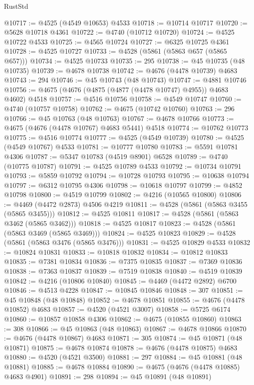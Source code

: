 \begin{lexlean}{RustStd}
\begin{coremodule}
{\begin{coremodule}
{{{{{{{{{{{{{{{{{{{{{{{{{{{{{{{{{{{{{{{{{{{{{{{{{{{{{{{{{{{{@10717 := @4525 (@4549 @10653) @4533
@10718 := @10714 @10717
@10720 := @5628 @10718 @4361
@10722 := @4740 (@10712 @10720)
@10724 := @4525 @10722 @4533
@10725 := @4565 @10724
@10727 := @6325 @10725 @4361
@10728 := @4525 @10727
@10733 := @4528 (@5861 (@5863 @657 (@5865 @657)))
@10734 := @4525 @10733
@10735 := 295
@10738 := @45 @10735 (@48 @10735)
@10739 := @4678 @10738
@10742 := @4676 (@4478 @10739) @4683
@10743 := 294
@10746 := @45 @10743 (@48 @10743)
@10747 := @4881 @10746
@10756 := @4675 (@4676 (@4875 (@4877 (@4478 @10747) @4955)) @4683 @4602) @4518
@10757 := @4516 @10756
@10758 := @4549 @10747
@10760 := @4740 (@10757 @10758)
@10762 := @4675 (@10742 @10760)
@10763 := 296
@10766 := @45 @10763 (@48 @10763)
@10767 := @4678 @10766
@10773 := @4675 (@4676 (@4478 @10767) @4683 @5441) @4518
@10774 := @10762 @10773
@10775 := @4516 @10774
@10777 := @4525 (@4549 @10739)
@10780 := @4525 (@4549 @10767) @4533
@10781 := @10777 @10780
@10783 := @5591 @10781 @4306
@10787 := @5347 @10783 (@4519 @8901) @6528
@10789 := @4740 (@10775 @10787)
@10791 := @4525 @10789 @4533
@10792 := @10734 @10791
@10793 := @5859 @10792
@10794 := @10728 @10793
@10795 := @10638 @10794
@10797 := @6312 @10795 @4306
@10798 := @10618 @10797
@10799 := @4852 @10798
@10800 := @4519 @10799
@10802 := @4216 (@10565 @10800)
@10806 := @4469 (@4472 @2873) @4506 @4219
@10811 := @4528 (@5861 (@5863 @3455 (@5865 @3455)))
@10812 := @4525 @10811
@10817 := @4528 (@5861 (@5863 @3462 (@5865 @3462)))
@10818 := @4525 @10817
@10823 := @4528 (@5861 (@5863 @3469 (@5865 @3469)))
@10824 := @4525 @10823
@10829 := @4528 (@5861 (@5863 @3476 (@5865 @3476)))
@10831 := @4525 @10829 @4533
@10832 := @10824 @10831
@10833 := @10818 @10832
@10834 := @10812 @10833
@10835 := @7381 @10834
@10836 := @7375 @10835
@10837 := @7369 @10836
@10838 := @7363 @10837
@10839 := @7519 @10838
@10840 := @4519 @10839
@10842 := @4216 (@10806 @10840)
@10845 := @4469 (@4472 @2892) @6700
@10846 := @4513 @4228
@10847 := @10845 @10846
@10848 := 307
@10851 := @45 @10848 (@48 @10848)
@10852 := @4678 @10851
@10855 := @4676 (@4478 @10852) @4683
@10857 := @4520 (@4521 @3007)
@10858 := @5725 @6174
@10860 := @10857 @10858 @4306
@10862 := @4675 (@10855 @10860)
@10863 := 308
@10866 := @45 @10863 (@48 @10863)
@10867 := @4678 @10866
@10870 := @4676 (@4478 @10867) @4683
@10871 := 305
@10874 := @45 @10871 (@48 @10871)
@10875 := @4678 @10874
@10878 := @4676 (@4478 @10875) @4683
@10880 := @4520 (@4521 @3500)
@10881 := 297
@10884 := @45 @10881 (@48 @10881)
@10885 := @4678 @10884
@10890 := @4675 (@4676 (@4478 @10885) @4683 @4901)
@10891 := 298
@10894 := @45 @10891 (@48 @10891)
}}}}}}}}}}}}}}}}}}}}}}}}}}}}}}}}}}}}}}}}}}}}}}}}}}}}}}}}}}}}
\end{coremodule}}
\end{coremodule}
\end{lexlean}
